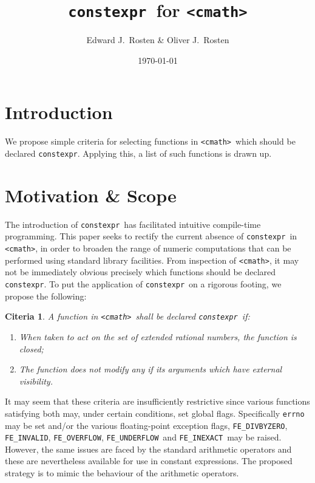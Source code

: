 \documentclass[prd,preprint,amsmath,amssymb,nofootinbib,eqsecnum]{revtex4-1}
\newcommand{\code}[1]{{\tt #1}}
\newcommand{\constexpr}{\code{constexpr}}
\newcommand{\header}[1]{{\tt <#1>}}
\newcommand{\cmath}{\header{cmath}}
\newcommand{\FEINVALID}{{\tt FE\_INVALID}}
\newcommand{\FEDIVBYZERO}{{\tt FE\_DIVBYZERO}}
\newcommand{\FEINEXACT}{{\tt FE\_INEXACT}}
\newcommand{\FEUNDERFLOW}{{\tt FE\_UNDERFLOW}}
\newcommand{\FEOVERFLOW}{{\tt FE\_OVERFLOW}}
\newtheorem{criteria}{Citeria}
\begin{document}
\title{\constexpr\ for \cmath}
\author{Edward J.~Rosten \& Oliver J.~Rosten}
\date{\today}
\maketitle

\section{Introduction}

We propose simple criteria for selecting functions in \cmath\ which should be declared \constexpr. Applying this, a list of such functions is drawn up.

\section{Motivation \& Scope}

The introduction of \constexpr\ has facilitated intuitive compile-time programming. This paper seeks to rectify the current absence of \constexpr\ in \cmath, in order to broaden the range of numeric computations that can be performed using standard library facilities. From inspection of \cmath, it may not be immediately obvious precisely which functions should be declared \constexpr. To put the application of \constexpr\ on a rigorous footing, we propose the following:
\begin{criteria}
	A function in \cmath\ shall be declared \constexpr\ if:
	\begin{enumerate}
		\item When taken to act on the set of extended rational numbers, the function is closed;
		
		\item The function does not modify any if its arguments which have external visibility.
	\end{enumerate}
\label{cri:rational}	
\end{criteria}

It may seem that these criteria are insufficiently restrictive since various functions satisfying both may, under certain conditions, set global flags. Specifically \code{errno} may be set and/or the various floating-point exception flags, \FEDIVBYZERO, \FEINVALID, \FEOVERFLOW, \FEUNDERFLOW\ and \FEINEXACT\ may be raised. However, the same issues are faced by the standard arithmetic operators and these are nevertheless available for use in constant expressions. The proposed strategy is to mimic the behaviour of the arithmetic operators.
\end{document}
